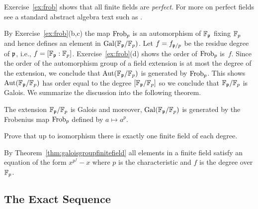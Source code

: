 \begin{remark}
  Exercise~\ref{ex:frob} shows that all finite fields
  are \emph{perfect}. For more on perfect fields see
  a standard abstract algebra text such as
  \cite{dummit2004abstract}.
\end{remark}

By Exercise~\ref{ex:frob}(b,c) the map $\operatorname{Frob}_p$ is an
automorphism of $\mathbb{F}_{\mathfrak{p}}$ fixing $\mathbb{F}_p$ and hence defines
an element in $\operatorname{Gal}(\mathbb{F}_{\mathfrak{p}}/\mathbb{F}_p)$. Let $f = f_{\mathfrak{p}/p}$ be the residue
degree of $\mathfrak{p}$, i.e., $f = [\mathbb{F}_{\mathfrak{p}}:\mathbb{F}_p]$.
Exercise~\ref{ex:frob}(d) shows the order of $\operatorname{Frob}_p$ is~$f$.
Since the order of the automorphism group of a field extension
is at most the degree of the extension, we conclude that
$\operatorname{Aut}(\mathbb{F}_{\mathfrak{p}}/\mathbb{F}_p)$ is generated by $\operatorname{Frob}_p$. This shows
$\operatorname{Aut}(\mathbb{F}_{\mathfrak{p}}/\mathbb{F}_p)$ has order equal to the degree $[\mathbb{F}_{\mathfrak{p}}/\mathbb{F}_p]$
so we conclude that $\mathbb{F}_{\mathfrak{p}}/\mathbb{F}_p$ is Galois.
We summarize the discussion into the following theorem.

\begin{theorem}\label{thm:galoisgroupfinitefield}
  The extension $\mathbb{F}_{\mathfrak{p}}/\mathbb{F}_p$ is Galois and moreover,
  $\operatorname{Gal}(\mathbb{F}_{\mathfrak{p}}/\mathbb{F}_p)$ is generated by the Frobenius map
  $\operatorname{Frob}_p$ defined by $a\mapsto a^p$.
\end{theorem}

\begin{exercise}
  Prove that up to isomorphism there is
  exactly one finite field of each degree.

  \begin{hint}
    By Theorem~\ref{thm:galoisgroupfinitefield}
    all elements in a finite field satisfy an equation
    of the form $x^{p^f} - x$ where $p$ is the
    characteristic and $f$ is the degree over $\mathbb{F}_p$.
  \end{hint}
\end{exercise}


\subsection{The Exact Sequence}\label{sec:exactseq}

